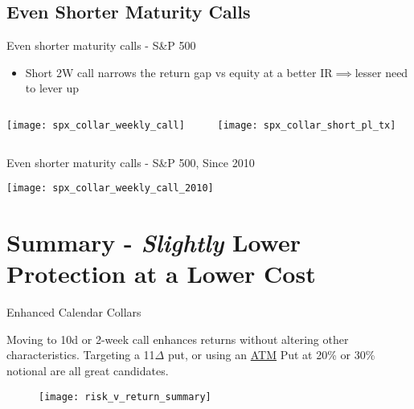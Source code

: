 \documentclass{beamer}
\begin{document}
\subsection{Even Shorter Maturity Calls}
\begin{frame}{Even shorter maturity calls - S\&P 500}

\begin{itemize}
\item Short 2W call narrows  the return gap vs equity at a better IR$\implies$lesser need to lever up 
\end{itemize}

\begin{columns}
\begin{column}{0.7\textwidth}
\texttt{[image: spx\_collar\_weekly\_call]}
\end{column}
\begin{column}{0.3\textwidth} 
    \begin{center}
     \texttt{[image: spx\_collar\_short\_pl\_tx]}
     \end{center}
\end{column}
\end{columns}

\end{frame}



\begin{frame}{Even shorter maturity calls - S\&P 500, Since 2010}

\texttt{[image: spx\_collar\_weekly\_call\_2010]}

\end{frame}


\section{Summary - {\em Slightly} Lower Protection at a Lower Cost}
\begin{frame}{Enhanced Calendar Collars}

\begin{block}{}
Moving to 10d or 2-week call enhances returns without altering other characteristics. 
Targeting a 11$\Delta$ put, or using an \underline{ATM}  Put at 20\% or 30\% notional are all great candidates.
\end{block}

\begin{figure}

\texttt{[image: risk\_v\_return\_summary]}
\end{figure}
\end{frame}
\end{document}
